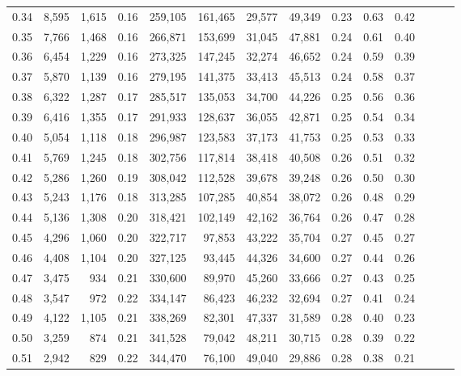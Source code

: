 \begin{tabular}{rrrrrrrrrrrrrr}
0.34 &   8,595 &  1,615 &  0.16 &  259,105 &  161,465 &  29,577 &  49,349 &  0.23 &  0.63 &      0.42 \\
0.35 &   7,766 &  1,468 &  0.16 &  266,871 &  153,699 &  31,045 &  47,881 &  0.24 &  0.61 &      0.40 \\
0.36 &   6,454 &  1,229 &  0.16 &  273,325 &  147,245 &  32,274 &  46,652 &  0.24 &  0.59 &      0.39 \\
0.37 &   5,870 &  1,139 &  0.16 &  279,195 &  141,375 &  33,413 &  45,513 &  0.24 &  0.58 &      0.37 \\
0.38 &   6,322 &  1,287 &  0.17 &  285,517 &  135,053 &  34,700 &  44,226 &  0.25 &  0.56 &      0.36 \\
0.39 &   6,416 &  1,355 &  0.17 &  291,933 &  128,637 &  36,055 &  42,871 &  0.25 &  0.54 &      0.34 \\
0.40 &   5,054 &  1,118 &  0.18 &  296,987 &  123,583 &  37,173 &  41,753 &  0.25 &  0.53 &      0.33 \\
0.41 &   5,769 &  1,245 &  0.18 &  302,756 &  117,814 &  38,418 &  40,508 &  0.26 &  0.51 &      0.32 \\
0.42 &   5,286 &  1,260 &  0.19 &  308,042 &  112,528 &  39,678 &  39,248 &  0.26 &  0.50 &      0.30 \\
0.43 &   5,243 &  1,176 &  0.18 &  313,285 &  107,285 &  40,854 &  38,072 &  0.26 &  0.48 &      0.29 \\
0.44 &   5,136 &  1,308 &  0.20 &  318,421 &  102,149 &  42,162 &  36,764 &  0.26 &  0.47 &      0.28 \\
0.45 &   4,296 &  1,060 &  0.20 &  322,717 &   97,853 &  43,222 &  35,704 &  0.27 &  0.45 &      0.27 \\
0.46 &   4,408 &  1,104 &  0.20 &  327,125 &   93,445 &  44,326 &  34,600 &  0.27 &  0.44 &      0.26 \\
0.47 &   3,475 &    934 &  0.21 &  330,600 &   89,970 &  45,260 &  33,666 &  0.27 &  0.43 &      0.25 \\
0.48 &   3,547 &    972 &  0.22 &  334,147 &   86,423 &  46,232 &  32,694 &  0.27 &  0.41 &      0.24 \\
0.49 &   4,122 &  1,105 &  0.21 &  338,269 &   82,301 &  47,337 &  31,589 &  0.28 &  0.40 &      0.23 \\
0.50 &   3,259 &    874 &  0.21 &  341,528 &   79,042 &  48,211 &  30,715 &  0.28 &  0.39 &      0.22 \\
0.51 &   2,942 &    829 &  0.22 &  344,470 &   76,100 &  49,040 &  29,886 &  0.28 &  0.38 &      0.21 \\

\end{tabular}
